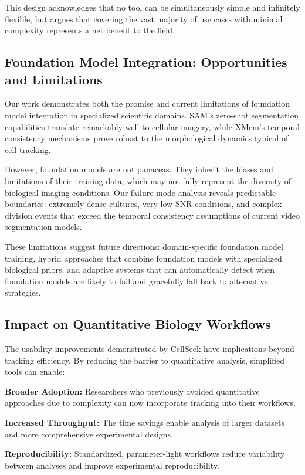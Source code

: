 \documentclass[12pt]{article}
\begin{document}
This design acknowledges that no tool can be simultaneously simple and infinitely flexible, but argues that covering the vast majority of use cases with minimal complexity represents a net benefit to the field.

\subsection{Foundation Model Integration: Opportunities and Limitations}

Our work demonstrates both the promise and current limitations of foundation model integration in specialized scientific domains. SAM's zero-shot segmentation capabilities translate remarkably well to cellular imagery, while XMem's temporal consistency mechanisms prove robust to the morphological dynamics typical of cell tracking.

However, foundation models are not panaceas. They inherit the biases and limitations of their training data, which may not fully represent the diversity of biological imaging conditions. Our failure mode analysis reveals predictable boundaries: extremely dense cultures, very low SNR conditions, and complex division events that exceed the temporal consistency assumptions of current video segmentation models.

These limitations suggest future directions: domain-specific foundation model training, hybrid approaches that combine foundation models with specialized biological priors, and adaptive systems that can automatically detect when foundation models are likely to fail and gracefully fall back to alternative strategies.

\subsection{Impact on Quantitative Biology Workflows}

The usability improvements demonstrated by CellSeek have implications beyond tracking efficiency. By reducing the barrier to quantitative analysis, simplified tools can enable:

\textbf{Broader Adoption:} Researchers who previously avoided quantitative approaches due to complexity can now incorporate tracking into their workflows.

\textbf{Increased Throughput:} The time savings enable analysis of larger datasets and more comprehensive experimental designs.

\textbf{Reproducibility:} Standardized, parameter-light workflows reduce variability between analyses and improve experimental reproducibility.
\end{document}
